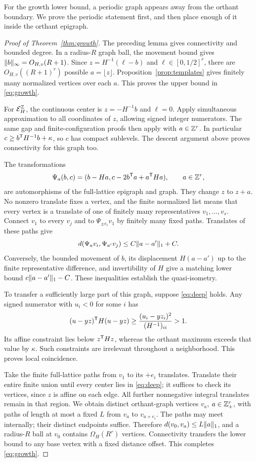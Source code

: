 For the growth lower bound, a periodic graph appears away from the orthant boundary. We prove the periodic statement first, and then place enough of it inside the orthant epigraph.

\begin{proof}[Proof of Theorem~\ref{thm:growth}]
The preceding lemma gives connectivity and bounded degree. In a radius-$R$ graph ball, the movement bound gives $\lVert b\rVert_\infty=O_{H,v}(R+1)$. Since $z=H^{-1}(\ell-b)$ and $\ell\in[0,1/2]^r$, there are $O_{H,v}((R+1)^r)$ possible $a=\lfloor z\rfloor$. Proposition~\ref{prop:templates} gives finitely many normalized vertices over each $a$. This proves the upper bound in \eqref{eq:growth}.

For $\mathcal E_H^\mathbb Z$, the continuous center is $z=-H^{-1}b$ and $\ell=0$. Apply simultaneous approximation to all coordinates of $z$, allowing signed integer numerators. The same gap and finite-configuration proofs then apply with $a\in\mathbb Z^r$. In particular $c\ge b^{\mathsf T} H^{-1}b+\kappa$, so $c$ has compact sublevels. The descent argument above proves connectivity for this graph too.

The transformations
\begin{equation}\label{eq:translation}
 \Psi_a(b,c)=(b-Ha,c-2b^{\mathsf T} a+a^{\mathsf T} Ha),\qquad a\in\mathbb Z^r,
\end{equation}
are automorphisms of the full-lattice epigraph and graph. They change $z$ to $z+a$. No nonzero translate fixes a vertex, and the finite normalized list means that every vertex is a translate of one of finitely many representatives $v_1,\ldots,v_s$. Connect $v_1$ to every $v_j$ and to $\Psi_{\pm e_i}v_1$ by finitely many fixed paths. Translates of these paths give
\[
 d(\Psi_a v_i,\Psi_{a'}v_j)\le C\lVert a-a'\rVert_1+C.
\]
Conversely, the bounded movement of $b$, its displacement $H(a-a')$ up to the finite representative difference, and invertibility of $H$ give a matching lower bound $c\lVert a-a'\rVert_1-C$. These inequalities establish the quasi-isometry.

To transfer a sufficiently large part of this graph, suppose \eqref{eq:deep} holds. Any signed numerator with $u_i<0$ for some $i$ has
\[
 (u-yz)^{\mathsf T} H(u-yz)\ge
 \frac{(u_i-yz_i)^2}{(H^{-1})_{ii}}>1.
\]
Its affine constraint lies below $z^{\mathsf T} Hz$, whereas the orthant maximum exceeds that value by $\kappa$. Such constraints are irrelevant throughout a neighborhood. This proves local coincidence.

Take the finite full-lattice paths from $v_1$ to its $+e_i$ translates. Translate their entire finite union until every center lies in \eqref{eq:deep}; it suffices to check its vertices, since $z$ is affine on each edge. All further nonnegative integral translates remain in that region. We obtain distinct orthant-graph vertices $v_a$, $a\in\mathbb Z_+^r$, with paths of length at most a fixed $L$ from $v_a$ to $v_{a+e_i}$. The paths may meet internally; their distinct endpoints suffice. Therefore $d(v_0,v_a)\le L\lVert a\rVert_1$, and a radius-$R$ ball at $v_0$ contains $\Omega_H(R^r)$ vertices. Connectivity transfers the lower bound to any base vertex with a fixed distance offset. This completes \eqref{eq:growth}.
\end{proof}

